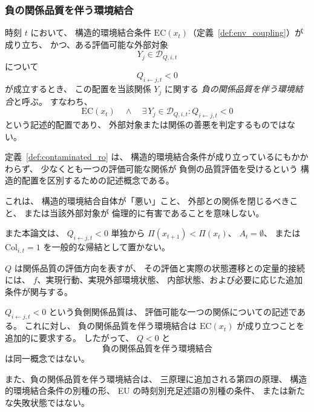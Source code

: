 \subsubsection{負の関係品質を伴う環境結合}

\begin{definition}
\label{def:contaminated_ro}
時刻 $t$ において、
構造的環境結合条件 $\mathrm{EC}(x_t)$（定義~\ref{def:env_coupling}）が成り立ち、
かつ、ある評価可能な外部対象
\[
  Y_j\in\mathcal D_{Q,i,t}
\]
について
\[
  Q_{i\leftarrow j,t}<0
\]
が成立するとき、
この配置を当該関係 $Y_j$ に関する
\emph{負の関係品質を伴う環境結合}と呼ぶ。
すなわち、
\[
  \mathrm{EC}(x_t)
  \quad\wedge\quad
  \exists\,Y_j\in\mathcal D_{Q,i,t}
  :
  Q_{i\leftarrow j,t}<0
\]
という記述的配置であり、
外部対象または関係の善悪を判定するものではない。
\end{definition}

\begin{remark}[負の関係品質を伴う環境結合の適用範囲]
\label{rem:contaminated_ro_scope}
定義~\ref{def:contaminated_ro} は、
構造的環境結合条件が成り立っているにもかかわらず、
少なくとも一つの評価可能な関係が
負側の品質評価を受けるという
構造的配置を区別するための記述概念である。

これは、
構造的環境結合自体が「悪い」こと、
外部との関係を閉じるべきこと、
または当該外部対象が
倫理的に有害であることを意味しない。

また本論文は、
$Q_{i\leftarrow j,t}<0$
単独から
$\Pi(x_{t+1})<\Pi(x_t)$、
$A_t=\emptyset$、
または
$\mathrm{Col}_{i,t}=1$
を一般的な帰結として置かない。

$Q$ は関係品質の評価方向を表すが、
その評価と実際の状態遷移との定量的接続には、
$f$、実現行動、実現外部環境状態、
内部状態、および必要に応じた追加条件が関与する。
\end{remark}

\begin{remark}[負側関係品質と負の関係品質を伴う環境結合は同一ではない]
\label{rem:contaminated_status}
$Q_{i\leftarrow j,t}<0$
という負側関係品質は、
評価可能な一つの関係についての記述である。
これに対し、
負の関係品質を伴う環境結合は
$\mathrm{EC}(x_t)$ が成り立つことを追加的に要求する。
したがって、
$Q<0$
と
\[
  \text{負の関係品質を伴う環境結合}
\]
は同一概念ではない。

また、負の関係品質を伴う環境結合は、
三原理に追加される第四の原理、
構造的環境結合条件の別種の形、
EU の時刻別充足述語の別種の条件、
または新たな失敗状態ではない。
\end{remark}


